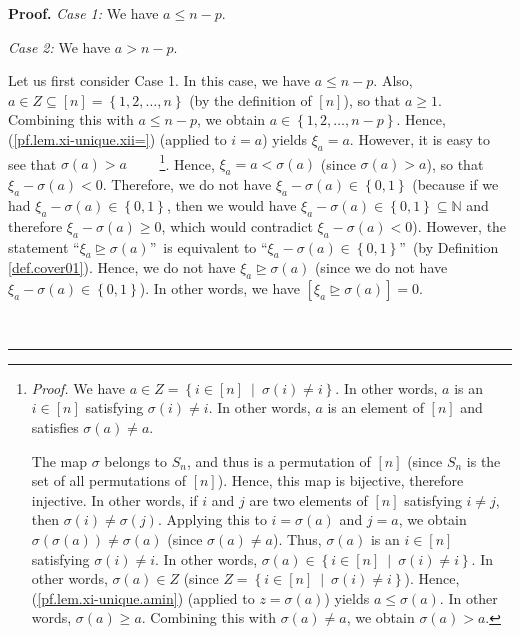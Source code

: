 \documentclass[numbers=enddot,12pt,final,onecolumn,notitlepage,english]{scrartcl}%
\theoremstyle{definition}
\newenvironment{proof}[1][Proof]{\noindent\textbf{#1.} }{\ \rule{0.5em}{0.5em}}
\newenvironment{verlong}{}{}
\begin{document}
\begin{verlong}
\begin{proof}
\textit{Case 1:} We have $a\leq n-p$.

\textit{Case 2:} We have $a>n-p$.

Let us first consider Case 1. In this case, we have $a\leq n-p$. Also, $a\in
Z\subseteq\left[  n\right]  =\left\{  1,2,\ldots,n\right\}  $ (by the
definition of $\left[  n\right]  $), so that $a\geq1$. Combining this with
$a\leq n-p$, we obtain $a\in\left\{  1,2,\ldots,n-p\right\}  $. Hence,
(\ref{pf.lem.xi-unique.xii=}) (applied to $i=a$) yields $\xi_{a}=a$. However,
it is easy to see that $\sigma\left(  a\right)  >a$%
\ \ \ \ \footnote{\textit{Proof.} We have $a\in Z=\left\{  i\in\left[
n\right]  \ \mid\ \sigma\left(  i\right)  \neq i\right\}  $. In other words,
$a$ is an $i\in\left[  n\right]  $ satisfying $\sigma\left(  i\right)  \neq
i$. In other words, $a$ is an element of $\left[  n\right]  $ and satisfies
$\sigma\left(  a\right)  \neq a$.
\par
The map $\sigma$ belongs to $S_{n}$, and thus is a permutation of $\left[
n\right]  $ (since $S_{n}$ is the set of all permutations of $\left[
n\right]  $). Hence, this map is bijective, therefore injective. In other
words, if $i$ and $j$ are two elements of $\left[  n\right]  $ satisfying
$i\neq j$, then $\sigma\left(  i\right)  \neq\sigma\left(  j\right)  $.
Applying this to $i=\sigma\left(  a\right)  $ and $j=a$, we obtain
$\sigma\left(  \sigma\left(  a\right)  \right)  \neq\sigma\left(  a\right)  $
(since $\sigma\left(  a\right)  \neq a$). Thus, $\sigma\left(  a\right)  $ is
an $i\in\left[  n\right]  $ satisfying $\sigma\left(  i\right)  \neq i$. In
other words, $\sigma\left(  a\right)  \in\left\{  i\in\left[  n\right]
\ \mid\ \sigma\left(  i\right)  \neq i\right\}  $. In other words,
$\sigma\left(  a\right)  \in Z$ (since $Z=\left\{  i\in\left[  n\right]
\ \mid\ \sigma\left(  i\right)  \neq i\right\}  $). Hence,
(\ref{pf.lem.xi-unique.amin}) (applied to $z=\sigma\left(  a\right)  $) yields
$a\leq\sigma\left(  a\right)  $. In other words, $\sigma\left(  a\right)  \geq
a$. Combining this with $\sigma\left(  a\right)  \neq a$, we obtain
$\sigma\left(  a\right)  >a$.}. Hence, $\xi_{a}=a<\sigma\left(  a\right)  $
(since $\sigma\left(  a\right)  >a$), so that $\xi_{a}-\sigma\left(  a\right)
<0$. Therefore, we do not have $\xi_{a}-\sigma\left(  a\right)  \in\left\{
0,1\right\}  $ (because if we had $\xi_{a}-\sigma\left(  a\right)  \in\left\{
0,1\right\}  $, then we would have $\xi_{a}-\sigma\left(  a\right)
\in\left\{  0,1\right\}  \subseteq\mathbb{N}$ and therefore $\xi_{a}%
-\sigma\left(  a\right)  \geq0$, which would contradict $\xi_{a}-\sigma\left(
a\right)  <0$). However, the statement \textquotedblleft$\xi_{a}%
\trianglerighteq\sigma\left(  a\right)  $\textquotedblright\ is equivalent to
\textquotedblleft$\xi_{a}-\sigma\left(  a\right)  \in\left\{  0,1\right\}
$\textquotedblright\ (by Definition \ref{def.cover01}). Hence, we do not have
$\xi_{a}\trianglerighteq\sigma\left(  a\right)  $ (since we do not have
$\xi_{a}-\sigma\left(  a\right)  \in\left\{  0,1\right\}  $). In other words,
we have $\left[  \xi_{a}\trianglerighteq\sigma\left(  a\right)  \right]  =0$.


\end{proof}
\end{verlong}
\end{document}
